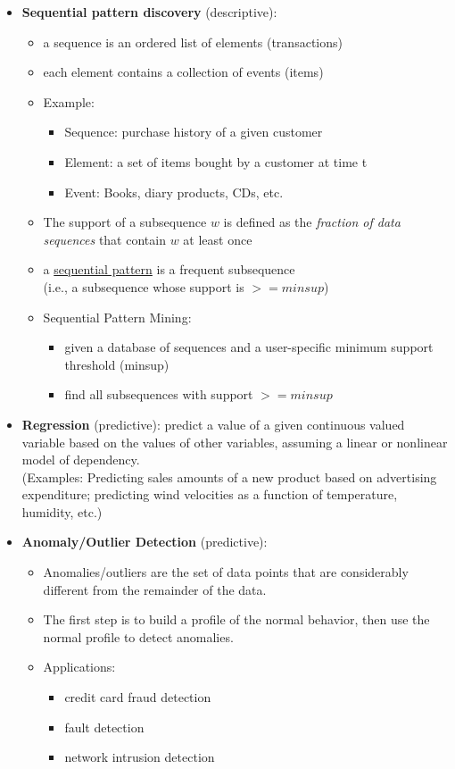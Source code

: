 \documentclass[10pt,a4paper]{article}
\begin{document}
\begin{itemize}
	\item \textbf{Sequential pattern discovery} (descriptive): 
	\begin{itemize}
		\item a sequence is an ordered list of elements (transactions)
		\item each element contains a collection of events (items)
		\item Example:
		\begin{itemize}
			\item Sequence: purchase history of a given customer
			\item Element: a set of items bought by a customer at time t
			\item Event: Books, diary products, CDs, etc.
		\end{itemize}
		\item The support of a subsequence $w$ is defined as the \textit{fraction of data sequences} that contain $w$ at least once
		\item a \uline{sequential pattern} is a frequent subsequence \\(i.e., a subsequence whose support is $>= minsup$) 
		\item Sequential Pattern Mining:
		\begin{itemize}
			\item given a database of sequences and a user-specific minimum support threshold (minsup)
			\item find all subsequences with support $>= minsup$
		\end{itemize}
\end{itemize}		
	\item \textbf{Regression} (predictive): predict a value of a given continuous valued variable based on the values of other variables, assuming a linear or nonlinear model of dependency. \\ 
	(Examples: Predicting sales amounts of a new product based on advertising expenditure; predicting wind velocities as a function of temperature, humidity, etc.)
	\item \textbf{Anomaly/Outlier Detection} (predictive): 
	\begin{itemize}
		\item Anomalies/outliers are the set of data points that are considerably different from the remainder of the data. 
		\item  The first step is to build a profile of the normal behavior, then use the normal profile to detect anomalies.
		\item Applications: 
		\begin{itemize}
			\item credit card fraud detection
			\item fault detection
			\item network intrusion detection
		\end{itemize}
	\end{itemize}	
\end{itemize}
\end{document}
